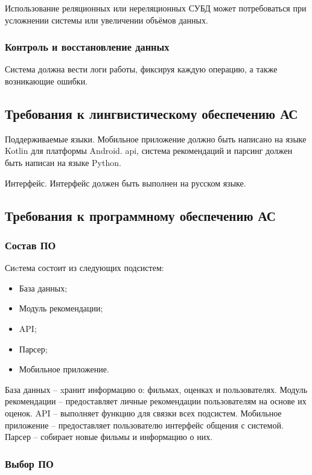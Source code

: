 Использование реляционных или нереляционных СУБД может потребоваться
при усложнении системы или увеличении объёмов данных.


\subsubsection{Контроль и восстановление данных}

Система должна вести логи работы, фиксируя каждую операцию, а также возникающие ошибки.

\subsection{Требования к лингвистическому обеспечению АС}

Поддерживаемые языки.
Мобильное приложение должно быть написано на языке Kotlin для платформы Android.
api, система рекомендаций и парсинг должен быть написан на языке Python.

Интерфейс.
Интерфейс должен быть выполнен на русском языке.

\subsection{Требования к программному обеспечению АС}

\subsubsection{Состав ПО}

Сиcтема состоит из следующих подсистем:
\begin{itemize}
	\item База данных;
	\item Модуль рекомендации;
	\item API;
	\item Парсер;
	\item Мобильное приложение.
\end{itemize}

База данных -- xранит информацию о: фильмах, оценках и пользователях.
Модуль рекомендации -- предоставляет личные рекомендации пользователям на основе их оценок.
API -- выполняет функцию для связки всех подсистем.
Мобильное приложение -- предоставляет пользователю интерфейс общения с системой.
Парсер -- собирает новые фильмы и информацию о них.

\subsubsection{Выбор ПО}


